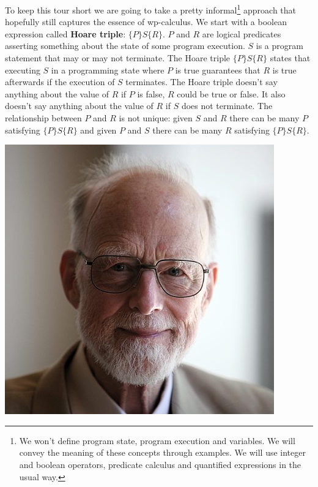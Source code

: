   
To keep this tour short we are going to take a pretty informal\footnote{We won't define program state, program execution and variables. We will convey the meaning of these concepts through examples. We will use integer and boolean operators, predicate calculus and quantified expressions in the usual way.} approach that hopefully still captures the essence of wp-calculus. We start with a boolean expression called \textbf{Hoare triple}: $\{P\} S \{R\}$. $P$ and $R$ are logical predicates asserting something about the state of some program execution. $S$ is a program statement that may or may not terminate. The Hoare triple $\{P\} S \{R\}$ states that executing $S$ in a programming state where $P$ is true guarantees that $R$ is true afterwards if the execution of $S$ terminates. The Hoare triple doesn't say anything about the value of $R$ if $P$ is false, $R$ could be true or false. It also doesn't say anything about the value of $R$ if $S$ does not terminate. The relationship between $P$ and $R$ is not unique: given $S$ and $R$ there can be many $P$ satisfying $\{P\} S \{R\}$ and given $P$ and $S$ there can be many $R$ satisfying $\{P\} S \{R\}$.

\begin{marginfigure}
\includegraphics[scale=0.33]{hoare.jpg}
\end{marginfigure}

